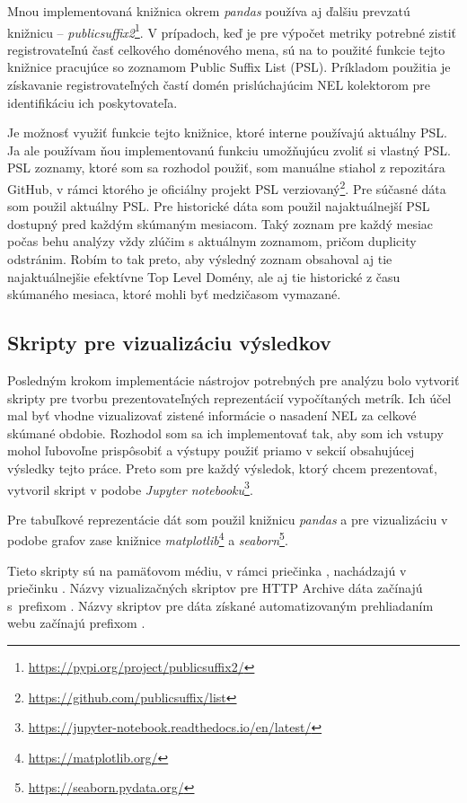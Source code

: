 Mnou implementovaná knižnica  okrem \textit{pandas} používa aj ďalšiu prevzatú knižnicu -- \textit{publicsuffix2}\footnote{\url{https://pypi.org/project/publicsuffix2/}}.
V prípadoch, keď je pre výpočet metriky potrebné zistiť registrovateľnú časť celkového doménového mena,
sú na to použité funkcie tejto knižnice pracujúce so zoznamom Public Suffix List (PSL). Príkladom použitia je získavanie registrovateľných častí domén prislúchajúcim NEL kolektorom pre identifikáciu ich poskytovateľa.

Je možnosť využiť funkcie tejto knižnice, ktoré interne používajú aktuálny PSL.
Ja ale používam ňou implementovanú funkciu umožňujúcu zvoliť si vlastný PSL.
PSL zoznamy, ktoré som sa rozhodol použiť, som manuálne stiahol z repozitára GitHub, v rámci ktorého je oficiálny projekt PSL verziovaný\footnote{\url{https://github.com/publicsuffix/list}}. 
Pre súčasné dáta som použil aktuálny PSL.
Pre historické dáta som použil najaktuálnejší PSL dostupný pred každým skúmaným mesiacom.
Taký zoznam pre každý mesiac počas behu analýzy vždy zlúčim s aktuálnym zoznamom, pričom duplicity odstránim.
Robím to tak preto, aby výsledný zoznam obsahoval aj tie najaktuálnejšie efektívne Top Level Domény, ale aj tie historické z času skúmaného mesiaca, ktoré mohli byť medzičasom vymazané.


\subsection{Skripty pre vizualizáciu výsledkov}
\label{visualize_results}

Posledným krokom implementácie nástrojov potrebných pre analýzu bolo vytvoriť skripty pre tvorbu prezentovateľných reprezentácií vypočítaných metrík.
Ich účel mal byť vhodne vizualizovať zistené informácie o nasadení NEL za celkové skúmané obdobie.
Rozhodol som sa ich implementovať tak, aby som ich vstupy mohol ľubovoľne prispôsobiť a výstupy použiť priamo v sekcií obsahujúcej výsledky tejto práce.
Preto som pre každý výsledok, ktorý chcem prezentovať, vytvoril skript v podobe \textit{Jupyter notebooku}\footnote{\url{https://jupyter-notebook.readthedocs.io/en/latest/}}.

Pre tabuľkové reprezentácie dát som použil knižnicu \textit{pandas} a pre vizualizáciu v podobe grafov zase knižnice \textit{matplotlib}\footnote{\url{https://matplotlib.org/}} a \textit{seaborn}\footnote{\url{https://seaborn.pydata.org/}}.

Tieto skripty sú na pamäťovom médiu, v rámci priečinka , nachádzajú v priečinku .
Názvy vizualizačných skriptov pre HTTP Archive dáta začínajú \mbox{s prefixom} .
Názvy skriptov pre dáta získané automatizovaným prehliadaním webu začínajú prefixom .

